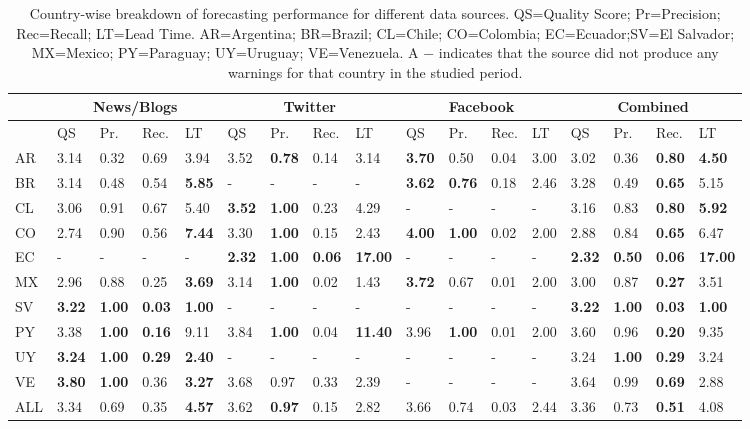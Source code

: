\documentclass[letterpaper]{article}
\begin{document}
\begin{table}
    \scriptsize
    \centering
    \caption{\label{tb:sourcewisecomparison} 
    \small Country-wise breakdown of forecasting performance for different data sources.
QS=Quality Score; Pr=Precision; Rec=Recall; LT=Lead Time.
AR=Argentina; BR=Brazil; CL=Chile; CO=Colombia; EC=Ecuador;SV=El Salvador; 
MX=Mexico; PY=Paraguay; UY=Uruguay; VE=Venezuela. A $-$
indicates that the source did not produce any warnings for that country
in the studied period.}
\begin{tabularx}{.9\textwidth}{*{17}{X}} %
        \toprule
        & \multicolumn{4}{c}{News/Blogs} & \multicolumn{4}{c}{Twitter} & \multicolumn{4}{c}{Facebook} & \multicolumn{4}{c}{Combined}\\
        \midrule
         & QS & Pr. & Rec. &LT & QS & Pr. & Rec. & LT & QS & Pr. & Rec. & LT & QS & Pr. & Rec. & LT\\
        \midrule
        AR &3.14&0.32&0.69&3.94&3.52&{\bf0.78}&0.14&3.14&{\bf3.70}&0.50&0.04&3.00&3.02&0.36&{\bf0.80}&{\bf4.50}\\
        BR &3.14&0.48&0.54&{\bf5.85}&-&-&-&-&{\bf3.62}&{\bf0.76}&0.18&2.46&3.28&0.49&{\bf0.65}&5.15\\
        CL &3.06&0.91&0.67&5.40&{\bf3.52}&{\bf1.00}&0.23&4.29&-&-&-&-&3.16&0.83&{\bf0.80}&{\bf5.92}\\
        CO &2.74&0.90&0.56&{\bf7.44}&3.30&{\bf1.00}&0.15&2.43&{\bf4.00}&{\bf1.00}&0.02&2.00&2.88&0.84&{\bf0.65}&6.47\\
        EC &-&-&-&-&{\bf2.32}&{\bf1.00}&{\bf0.06}&{\bf17.00}&-&-&-&-&{\bf2.32}&{\bf0.50}&{\bf0.06}&{\bf17.00}\\
        MX &2.96&0.88&0.25&{\bf3.69}&3.14&{\bf1.00}&0.02&1.43&{\bf3.72}&0.67&0.01&2.00&3.00&0.87&{\bf0.27}&3.51\\
        SV &{\bf3.22}&{\bf1.00}&{\bf0.03}&{\bf1.00}&-&-&-&-&-&-&-&-&{\bf3.22}&{\bf1.00}&{\bf0.03}&{\bf1.00}\\
        PY &3.38&{\bf1.00}&{\bf0.16}&9.11&3.84&{\bf1.00}&0.04&{\bf11.40}&3.96&{\bf1.00}&0.01&2.00&3.60&0.96&{\bf0.20}&9.35\\
        UY &{\bf3.24}&{\bf1.00}&{\bf0.29}&{\bf2.40}&-&-&-&-&-&-&-&-&3.24&{\bf1.00}&{\bf0.29}&3.24\\
        VE &{\bf3.80}&{\bf1.00}&0.36&{\bf3.27}&3.68&0.97&0.33&2.39&-&-&-&-&3.64&0.99&{\bf0.69}&2.88\\
        ALL &3.34&0.69&0.35&{\bf4.57}&3.62&{\bf0.97}&0.15&2.82&3.66&0.74&0.03&2.44&3.36&0.73&{\bf0.51}&4.08\\
        \bottomrule
    \end{tabularx}
\end{table}
\end{document}
